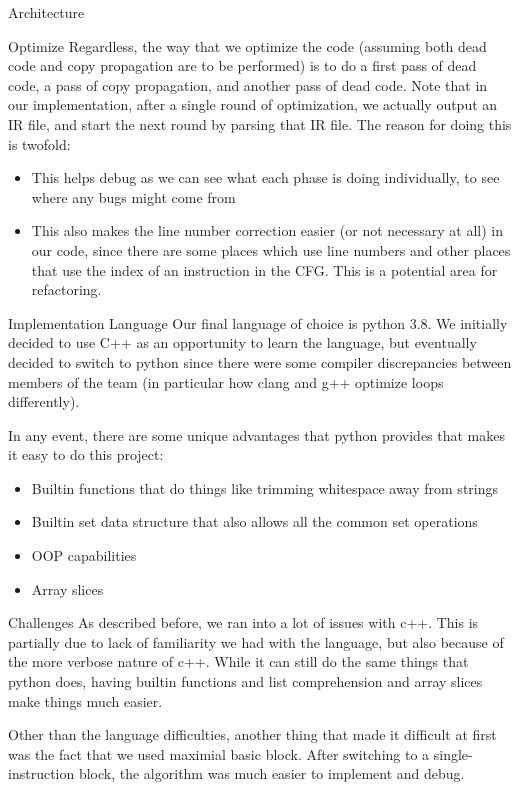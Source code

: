 \documentclass[letterpaper,12pt]{article}
\theoremstyle{definition}
\begin{document}
\begin{section}{Architecture}
\begin{subsection}{Optimize}
			Regardless, the way that we optimize the code (assuming both dead code and copy propagation are to be performed) is to do a first pass of dead code, a pass of copy propagation, and another pass of dead code. Note that in our implementation, after a single round of optimization, we actually output an IR file, and start the next round by parsing that IR file. The reason for doing this is twofold:
			\begin{itemize}
				\item This helps debug as we can see what each phase is doing individually, to see where any bugs might come from
				\item This also makes the line number correction easier (or not necessary at all) in our code, since there are some places which use line numbers and other places that use the index of an instruction in the CFG. This is a potential area for refactoring.
			\end{itemize}
		\end{subsection}
	\end{section}

	\begin{section}{Implementation Language}
		Our final language of choice is python 3.8. We initially decided to use C++ as an opportunity to learn the language, but eventually decided to switch to python since there were some compiler discrepancies between members of the team (in particular how clang and g++ optimize loops differently).

		In any event, there are some unique advantages that python provides that makes it easy to do this project:
		\begin{itemize}
			\item Builtin functions that do things like trimming whitespace away from strings
			\item Builtin set data structure that also allows all the common set operations
			\item OOP capabilities
			\item Array slices
		\end{itemize}
	\end{section}

	\begin{section}{Challenges}
		As described before, we ran into a lot of issues with c++. This is partially due to lack of familiarity we had with the language, but also because of the more verbose nature of c++. While it can still do the same things that python does, having builtin functions and list comprehension and array slices make things much easier.

		Other than the language difficulties, another thing that made it difficult at first was the fact that we used maximial basic block. After switching to a single-instruction block, the algorithm was much easier to implement and debug.
	\end{section}
\end{document}
